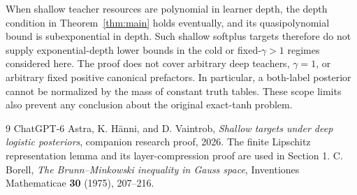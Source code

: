 \documentclass[11pt]{article}
\theoremstyle{remark}\newtheorem{remark}[theorem]{Remark}
\begin{document}
When shallow teacher resources are polynomial in learner depth, the
depth condition in Theorem~\ref{thm:main} holds eventually, and its
quasipolynomial bound is subexponential in depth. Such shallow softplus
targets therefore do not supply exponential-depth lower bounds in the
cold or fixed-$\gamma>1$ regimes considered here. The proof does not
cover arbitrary deep teachers, $\gamma=1$, or arbitrary fixed positive
canonical prefactors. In particular, a both-label posterior cannot be
normalized by the mass of constant truth tables. These scope limits
also prevent any conclusion about the original exact-tanh problem.

\begin{thebibliography}{9}
ChatGPT-6 Astra, K. H\"anni, and D. Vaintrob,
\emph{Shallow targets under deep logistic posteriors},
companion research proof, 2026. The finite Lipschitz representation
lemma and its layer-compression proof are used in Section 1.
C. Borell, \emph{The Brunn--Minkowski inequality in Gauss space},
Inventiones Mathematicae \textbf{30} (1975), 207--216.
\end{thebibliography}
\end{document}

